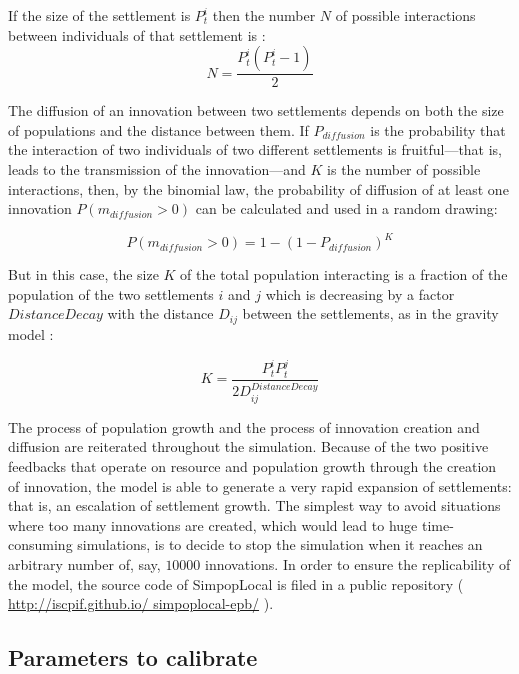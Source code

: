 If the size of the settlement is $P^{i}_{t}$ then the number $N$ of possible interactions between individuals of that settlement is :
 \begin{equation}
N = \frac{P^{i}_{t} \left(P^{i}_{t}  - 1 \right)}{2}
\end{equation}

The diffusion of an innovation between two settlements depends on both the size of populations and the distance between them. If $P_{diffusion}$ is the probability that the interaction of two individuals of two different settlements is fruitful—that is, leads to the transmission of the innovation—and $K$ is the number of possible interactions, then, by the binomial law, the probability of diffusion of at least one innovation $P ( m_{diffusion} > 0)$ can be calculated and used in a random drawing:

\begin{equation}
P (m_{diffusion} > 0 ) = 1 - ( 1 - P_{diffusion})^{K}
\end{equation}

But in this case, the size $K$ of the total population interacting is a fraction of the population of the two settlements $i$ and $j$ which is decreasing by a factor $DistanceDecay$ with the distance $D_{ij}$ between the settlements, as in the gravity model \autocite{Wilson1971}:

\begin{equation}
K = \frac{P^{i}_{t} P^{j}_{t}}{ 2 D^{DistanceDecay}_{ij}}
\end{equation}

The process of population growth and the process of innovation creation and diffusion are reiterated throughout the simulation. Because of the two positive feedbacks that operate on resource and population growth through the creation of innovation, the model is able to generate a very rapid expansion of settlements: that is, an escalation of settlement growth. The simplest way to avoid situations where too many innovations are created, which would lead to huge time-consuming simulations, is to decide to stop the simulation when it reaches an arbitrary number of, say, $\num{10000}$ innovations. In order to ensure the replicability of the model, the source code of SimpopLocal is filed in a public repository ( \href{http://iscpif.github.io/ simpoplocal-epb/}{http://iscpif.github.io/ simpoplocal-epb/} ).


\subsection{Parameters to calibrate}
\label{subsec:parameters}

